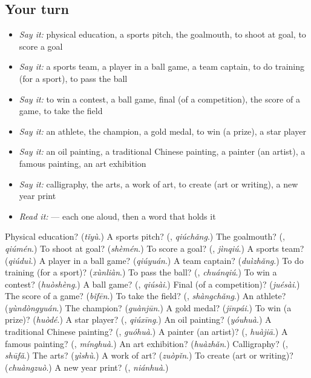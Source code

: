 \subsection*{Your turn}
\begin{itemize}
\raggedright
  \item \emph{Say it:} physical education, a sports pitch, the goalmouth, to shoot at goal, to score a goal
  \item \emph{Say it:} a sports team, a player in a ball game, a team captain, to do training (for a sport), to pass the ball
  \item \emph{Say it:} to win a contest, a ball game, final (of a competition), the score of a game, to take the field
  \item \emph{Say it:} an athlete, the champion, a gold medal, to win (a prize), a star player
  \item \emph{Say it:} an oil painting, a traditional Chinese painting, a painter (an artist), a famous painting, an art exhibition
  \item \emph{Say it:} calligraphy, the arts, a work of art, to create (art or writing), a new year print
  \item \emph{Read it:}    — each one aloud, then a word that holds it
\end{itemize}

\begin{tcolorbox}[breakable,colback=teal!4,colframe=teal!35!black,title={Before you move on}]
Physical education? (\emph{tǐyù}.) A sports pitch? (\textbf{}, \emph{qiúchǎng}.) The goalmouth? (\textbf{}, \emph{qiúmén}.) To shoot at goal? (\emph{shèmén}.) To score a goal? (\textbf{}, \emph{jìnqiú}.) A sports team? (\emph{qiúduì}.) A player in a ball game? (\emph{qiúyuán}.) A team captain? (\emph{duìzhǎng}.) To do training (for a sport)? (\emph{xùnliàn}.) To pass the ball? (\textbf{}, \emph{chuánqiú}.) To win a contest? (\emph{huòshèng}.) A ball game? (\textbf{}, \emph{qiúsài}.) Final (of a competition)? (\emph{juésài}.) The score of a game? (\emph{bǐfēn}.) To take the field? (\textbf{}, \emph{shàngchǎng}.) An athlete? (\emph{yùndòngyuán}.) The champion? (\emph{guànjūn}.) A gold medal? (\emph{jīnpái}.) To win (a prize)? (\emph{huòdé}.) A star player? (\textbf{}, \emph{qiúxīng}.) An oil painting? (\emph{yóuhuà}.) A traditional Chinese painting? (\textbf{}, \emph{guóhuà}.) A painter (an artist)? (\textbf{}, \emph{huàjiā}.) A famous painting? (\textbf{}, \emph{mínghuà}.) An art exhibition? (\emph{huàzhǎn}.) Calligraphy? (\textbf{}, \emph{shūfǎ}.) The arts? (\emph{yìshù}.) A work of art? (\emph{zuòpǐn}.) To create (art or writing)? (\emph{chuàngzuò}.) A new year print? (\textbf{}, \emph{niánhuà}.)
\end{tcolorbox}
